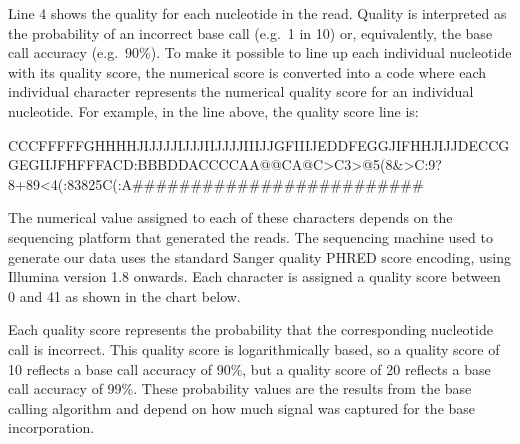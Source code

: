 \documentclass[
  letterpaper,
  DIV=11,
  numbers=noendperiod]{scrreprt}
\newenvironment{Shaded}{\begin{snugshade}}{\end{snugshade}}
\newcommand{\ErrorTok}[1]{\textcolor[rgb]{0.68,0.00,0.00}{#1}}
\newcommand{\ExtensionTok}[1]{\textcolor[rgb]{0.00,0.23,0.31}{#1}}
\newcommand{\NormalTok}[1]{\textcolor[rgb]{0.00,0.23,0.31}{#1}}
\newcommand{\OperatorTok}[1]{\textcolor[rgb]{0.37,0.37,0.37}{#1}}
\newcommand{\PreprocessorTok}[1]{\textcolor[rgb]{0.68,0.00,0.00}{#1}}
\newcommand{\StringTok}[1]{\textcolor[rgb]{0.13,0.47,0.30}{#1}}
\begin{document}
Line 4 shows the quality for each nucleotide in the read. Quality is
interpreted as the probability of an incorrect base call (e.g.~1 in 10)
or, equivalently, the base call accuracy (e.g.~90\%). To make it
possible to line up each individual nucleotide with its quality score,
the numerical score is converted into a code where each individual
character represents the numerical quality score for an individual
nucleotide. For example, in the line above, the quality score line is:

\begin{Shaded}
\begin{Highlighting}[]
\ExtensionTok{CCCFFFFFGHHHHJIJJJJIJJJIIJJJJIIIJJGFIIIJEDDFEGGJIFHHJIJJDECCGGEGIIJFHFFFACD:BBBDDACCCCAA@@CA@C}\OperatorTok{\textgreater{}}\NormalTok{C3}\OperatorTok{\textgreater{}}\NormalTok{@5}\ErrorTok{(}\ExtensionTok{8}\OperatorTok{\&\textgreater{}}\NormalTok{C:9}\PreprocessorTok{?}\NormalTok{8+89}\OperatorTok{\textless{}}\NormalTok{4}\ErrorTok{(}\ExtensionTok{:83825C}\ErrorTok{(}\ExtensionTok{:A\#\#\#\#\#\#\#\#\#\#\#\#\#\#\#\#\#\#\#\#\#\#\#\#\#}
\end{Highlighting}
\end{Shaded}

The numerical value assigned to each of these characters depends on the
sequencing platform that generated the reads. The sequencing machine
used to generate our data uses the standard Sanger quality PHRED score
encoding, using Illumina version 1.8 onwards. Each character is assigned
a quality score between 0 and 41 as shown in the chart below.

\begin{Shaded}
\end{Shaded}

Each quality score represents the probability that the corresponding
nucleotide call is incorrect. This quality score is logarithmically
based, so a quality score of 10 reflects a base call accuracy of 90\%,
but a quality score of 20 reflects a base call accuracy of 99\%. These
probability values are the results from the base calling algorithm and
depend on how much signal was captured for the base incorporation.
\end{document}

